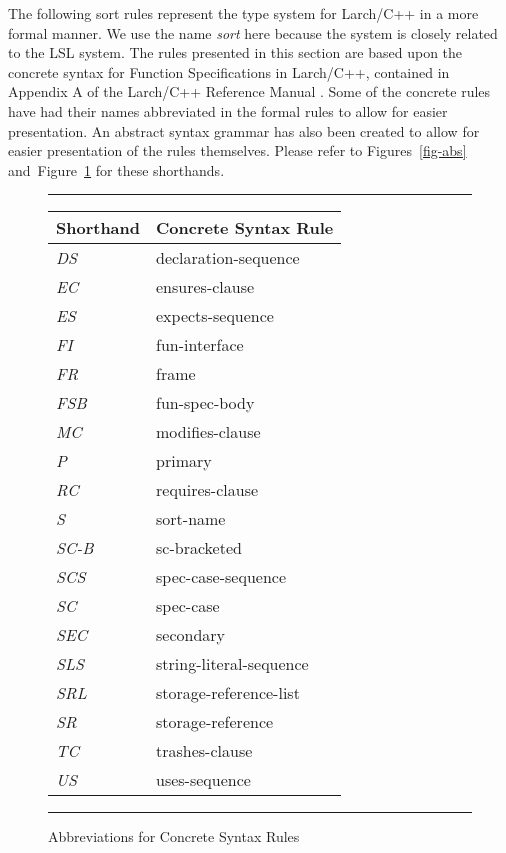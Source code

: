 \documentclass[12pt]{article} %
\newcommand{\UNSPACEFORBOX}{\vspace{-2ex}}
\newcommand{\HLINE}{\UNSPACEFORBOX%
\begin{flushleft}\rule{\textwidth}{0.01in}\end{flushleft}%
\UNSPACEFORBOX}
\newenvironment{BFIGURE}{

\begin{figure}
\small
\HLINE
}{
\HLINE
\normalsize
\end{figure}
}
\begin{document}
The following sort rules represent the type system for Larch/C++ in a
more formal manner. We use the name \emph{sort} here because the
system is closely related to the LSL system. The rules presented in
this section are based upon the concrete syntax for Function
Specifications in Larch/C++, contained in Appendix A of the Larch/C++
Reference Manual \cite{Leavens96c}. Some of the concrete rules have
had their names abbreviated in the formal rules to allow for easier
presentation. An abstract syntax grammar has also been created to
allow for easier presentation of the rules themselves. Please refer to
Figures~\ref{fig-abs} and~Figure~\ref{abb-fig} for these shorthands.

%
\begin{BFIGURE}
\begin{center}
\begin{tabular}{|l| |l|}
Shorthand & Concrete Syntax Rule \\
\hline
\mbox{\textit{DS}} & declaration-sequence \\
\mbox{\textit{EC}} & ensures-clause \\
\mbox{\textit{ES}} & expects-sequence \\
\mbox{\textit{FI}} & fun-interface \\
\mbox{\textit{FR}} & frame \\
\mbox{\textit{FSB}} & fun-spec-body \\
\mbox{\textit{MC}} & modifies-clause \\
\mbox{\textit{P}} & primary \\
\mbox{\textit{RC}} & requires-clause \\
\mbox{\textit{S}} & sort-name \\
\mbox{\textit{SC-B}} & sc-bracketed \\
\mbox{\textit{SCS}} & spec-case-sequence \\
\mbox{\textit{SC}} & spec-case \\
\mbox{\textit{SEC}} & secondary \\
\mbox{\textit{SLS}} & string-literal-sequence \\
\mbox{\textit{SRL}} & storage-reference-list \\
\mbox{\textit{SR}} & storage-reference \\
\mbox{\textit{TC}} & trashes-clause \\
\mbox{\textit{US}} & uses-sequence \\
\end{tabular}
\end{center}
\caption{Abbreviations for Concrete Syntax Rules}
\label{abb-fig}
\end{BFIGURE}
\end{document}
